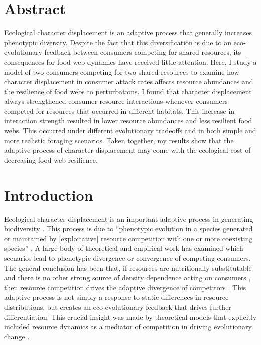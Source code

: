 \documentclass[11pt,]{article}
\begin{document}
\newpage

\section{Abstract}\label{abstract}

Ecological character displacement is an adaptive process that generally
increases phenotypic diversity. Despite the fact that this
diversification is due to an eco-evolutionary feedback between consumers
competing for shared resources, its consequences for food-web dynamics
have received little attention. Here, I study a model of two consumers
competing for two shared resources to examine how character displacement
in consumer attack rates affects resource abundances and the resilience
of food webs to perturbations. I found that character displacement
always strengthened consumer-resource interactions whenever consumers
competed for resources that occurred in different habitats. This
increase in interaction strength resulted in lower resource abundances
and less resilient food webs. This occurred under different evolutionary
tradeoffs and in both simple and more realistic foraging scenarios.
Taken together, my results show that the adaptive process of character
displacement may come with the ecological cost of decreasing food-web
resilience.

\newpage

\section{Introduction}\label{introduction}

Ecological character displacement is an important adaptive process in
generating biodiversity \citep{Schluter2000, Pfennig2010}. This process
is due to ``phenotypic evolution in a species generated or maintained by
{[}exploitative{]} resource competition with one or more coexisting
species'' \citep{Schluter2000}. A large body of theoretical
\citep[e.g.][]{Lawlor1976, Abrams1986, Doebeli1996, Taper1985, McPeek2019}
and empirical \citep[reviewed
in:][]{Schluter2000, Dayan2005, Stuart2013} work has examined which
scenarios lead to phenotypic divergence or convergence of competing
consumers. The general conclusion has been that, if resources are
nutritionally substitutable \citep{Abrams1987, Fox2008} and there is no
other strong source of density dependence acting on consumers
\citep{Abrams1986}, then resource competition drives the adaptive
divergence of competitors \citep{Lawlor1976, Taper1985}. This adaptive
process is not simply a response to static differences in resource
distributions, but creates an eco-evolutionary feedback that drives
further differentiation. This crucial insight was made by theoretical
models that explicitly included resource dynamics as a mediator of
competition in driving evolutionary change
\citep{Lawlor1976, Abrams1986, Taper1985}.
\end{document}
